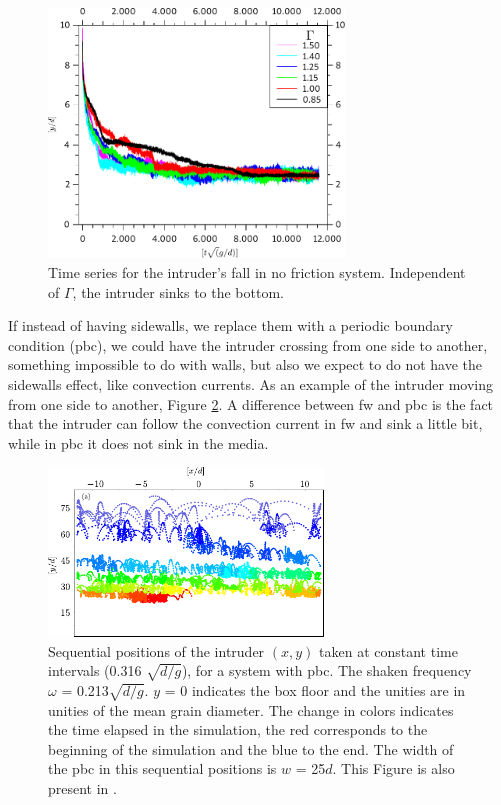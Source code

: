 \begin{figure}[H]
    \centering
    \includegraphics[width=0.7\textwidth]{04-figuras/BNE25000semAtrito.pdf}
    \caption[Frictionless grains and walls.]{Time series for the intruder's fall in no friction system. Independent of $\Gamma$, the intruder sinks to the bottom.}
    \label{fig:BNE25000_sem_Atrito}
\end{figure}

    If instead of having sidewalls, we replace them with a periodic boundary condition (pbc), we could have the intruder crossing from one side to another, something impossible to do with walls, but also we expect to do not have the sidewalls effect, like convection currents. As an example of the intruder moving from one side to another, Figure \ref{fig:BNE_intruderpbc}. A difference between fw and pbc is the fact that the intruder can follow the convection current in fw and sink a little bit, while in pbc it does not sink in the media.

\begin{figure}[H]
    \centering
    \includegraphics[width=0.65\textwidth]{04-figuras/BNE_PositionPBC.pdf}
    \caption[BNE with periodic boundary: sample of intruder positions.]{Sequential positions of the intruder $(x, y)$ taken at constant time intervals (0.316 $\sqrt{d/g}$), for a system with pbc. The shaken frequency $\omega$ = 0.213$\sqrt{d/g}$. $y$ = 0 indicates the box floor and the unities are in unities of the mean grain diameter. The change in colors indicates the time elapsed in the simulation, the red corresponds to the beginning of the simulation and the blue to the end. The width of the pbc in this sequential positions is $w$ = 25$d$. This Figure is also present in \cite{Large-deviation_quantification_of_boundary_conditions_on_the_Brazil_nut_effect}.}
    \label{fig:BNE_intruderpbc}
\end{figure}


